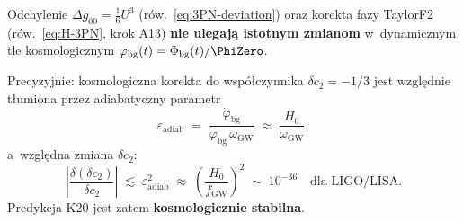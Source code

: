 \begin{proposition}%
\label{prop:3PN-cosmo-stability}
Odchylenie $\Delta g_{00} = \tfrac{1}{6}U^3$ (r\'ow.~\eqref{eq:3PN-deviation})
oraz korekta fazy TaylorF2 (r\'ow.~\eqref{eq:H-3PN}, krok A13)
\textbf{nie ulegaj\k{a} istotnym zmianom} w~dynamicznym tle
kosmologicznym $\varphi_{\mathrm{bg}}(t) = \Phi_{\mathrm{bg}}(t)/\PhiZero$.

Precyzyjnie: kosmologiczna korekta do wspó\l{}czynnika $\delta c_2 = -1/3$
jest wzgl\k{e}dnie t\l{}umiona przez adiabatyczny parametr
\begin{equation}\label{eq:3PN-adiabatic}
  \varepsilon_{\mathrm{adiab}}
  \;=\; \frac{\dot\varphi_{\mathrm{bg}}}{\varphi_{\mathrm{bg}}\,\omega_{\mathrm{GW}}}
  \;\approx\; \frac{H_0}{\omega_{\mathrm{GW}}},
\end{equation}
a~wzgl\k{e}dna zmiana $\delta c_2$:
\begin{equation}\label{eq:3PN-cosmo-corr}
  \left|\frac{\delta(\delta c_2)}{\delta c_2}\right|
  \;\lesssim\; \varepsilon_{\mathrm{adiab}}^2
  \;\approx\; \left(\frac{H_0}{f_{\mathrm{GW}}}\right)^2
  \;\sim\; 10^{-36}
  \quad\text{dla LIGO/LISA.}
\end{equation}
Predykcja K20 jest zatem \textbf{kosmologicznie stabilna}.
\end{proposition}

